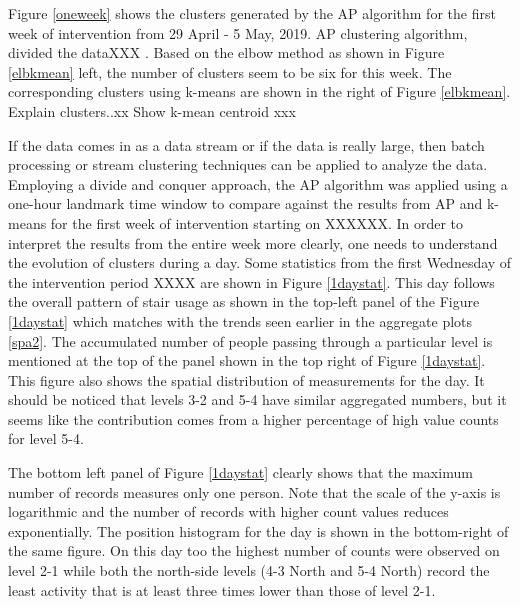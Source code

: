     
Figure \ref{oneweek} shows the clusters generated by the AP algorithm for the first week of intervention from 29 April - 5 May, 2019. AP clustering algorithm, divided the dataXXX .
Based on the elbow method as shown in Figure \ref{elbkmean} left, the number of clusters seem to be six for this week. The corresponding clusters using k-means  are shown in the right of Figure \ref{elbkmean}. Explain clusters..xx Show k-mean centroid xxx
 




    
If the data comes in as a data stream or if the data is really large, then batch processing or stream clustering techniques can be applied to analyze the data. Employing a divide and conquer approach, the AP algorithm was applied using a one-hour landmark time window to compare against the results from AP and k-means for the first week of intervention starting on XXXXXX. In order to interpret the results from the entire week more clearly, one needs to understand the evolution of clusters during a day. Some statistics from the first Wednesday of the intervention period XXXX are shown in Figure \ref{1daystat}. This day follows the overall pattern of stair usage as shown in the top-left panel of the Figure \ref{1daystat} which matches with the trends seen earlier in the aggregate plots \ref{spa2}. The accumulated number of people passing through a particular level is mentioned at the top of the panel shown in the top right of Figure \ref{1daystat}. This figure also shows the spatial distribution of measurements for the day. It should be noticed that levels 3-2 and 5-4 have similar aggregated numbers, but it seems like the contribution comes from a higher percentage of high value counts for level 5-4.

The bottom left panel of Figure \ref{1daystat} clearly shows that the maximum number of records measures only one person. Note that the scale of the y-axis is logarithmic and the number of records with higher count values reduces exponentially. The position histogram for the day is shown in the bottom-right of the same figure. On this day too the highest number of counts were observed on level 2-1 while both the north-side levels (4-3 North and 5-4 North) record the least activity that is at least three times lower than those of level 2-1. 

